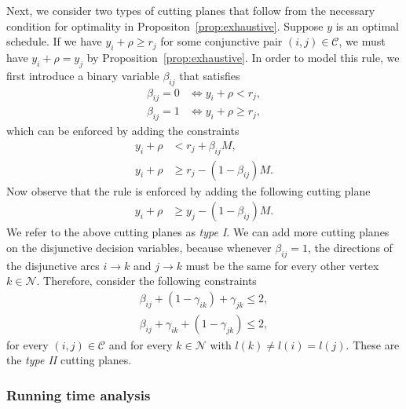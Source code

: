 \documentclass[a4paper]{article}
\theoremstyle{definition}
\theoremstyle{plain}
\begin{document}
Next, we consider two types of cutting planes that follow from the necessary condition
for optimality in Propositon~\ref{prop:exhaustive}.
%
Suppose $y$ is an optimal schedule. If we have $y_{i} + \rho \geq r_{j}$ for
some conjunctive pair $(i,j) \in \mathcal{C}$, we must have $y_{i} + \rho = y_{j}$
by Proposition~\ref{prop:exhaustive}. In order to model this rule, we first introduce a binary
variable $\beta_{ij}$ that satisfies
\begin{align*}
  \beta_{ij} = 0 &\iff y_{i} + \rho < r_{j} , \\
  \beta_{ij} = 1 &\iff y_{i} + \rho \geq r_{j} ,
\end{align*}
which can be enforced by adding the constraints
\begin{align*}
  y_{i} + \rho &< r_{j} + \beta_{ij}M , \\
  y_{i} + \rho &\geq r_{j} - (1 - \beta_{ij}) M .
\end{align*}
Now observe that the rule is enforced by adding the following cutting plane
\begin{align*}
  y_{i} + \rho &\geq y_{j} - (1 - \beta_{ij}) M .
\end{align*}
We refer to the above cutting planes as \textit{type I}.
%
We can add more cutting planes on the disjunctive decision variables, because
whenever $\beta_{ij} = 1$, the directions of the disjunctive arcs $i \rightarrow k$ and
$j \rightarrow k$ must be the same for every other vertex $k \in \mathcal{N}$. Therefore,
consider the following constraints
\begin{align*}
  \beta_{ij} + (1 - \gamma_{ik}) + \gamma_{jk} \leq 2 , \\
  \beta_{ij} + \gamma_{ik} + (1 - \gamma_{jk}) \leq 2 ,
\end{align*}
for every $(i,j) \in \mathcal{C}$ and for every $k \in \mathcal{N}$ with $l(k) \neq l(i) = l(j)$.
These are the \textit{type II} cutting planes.


\subsubsection*{Running time analysis}


\end{document}
